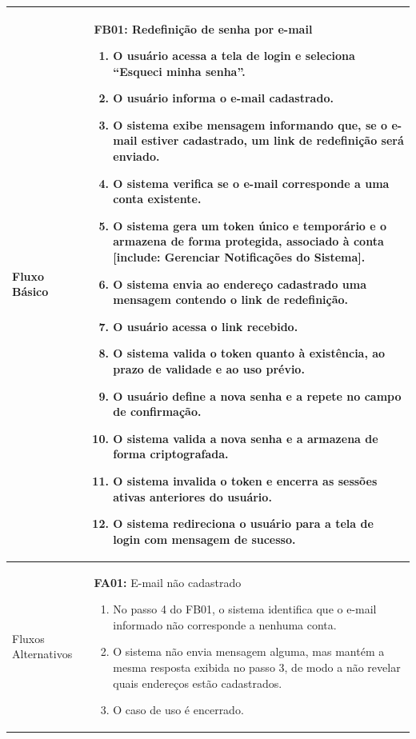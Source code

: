 \begin{longtable}{ >{\raggedright}p{2.8cm} | >{\raggedright\arraybackslash}p{10.7cm} }
Fluxo Básico & \mbox{}
\textbf{FB01:} Redefinição de senha por e-mail
\vspace{2pt}
\begin{enumerate}[nosep,leftmargin=1.2em,topsep=0pt,partopsep=0pt,parsep=0pt,itemsep=0pt,after=\vspace{2pt}]
    \item O usuário acessa a tela de login e seleciona ``Esqueci minha senha''.
    \item O usuário informa o e-mail cadastrado.
    \item O sistema exibe mensagem informando que, se o e-mail estiver cadastrado, um link de redefinição será enviado.
    \item O sistema verifica se o e-mail corresponde a uma conta existente.
    \item O sistema gera um token único e temporário e o armazena de forma protegida, associado à conta [include: Gerenciar Notificações do Sistema].
    \item O sistema envia ao endereço cadastrado uma mensagem contendo o link de redefinição.
    \item O usuário acessa o link recebido.
    \item O sistema valida o token quanto à existência, ao prazo de validade e ao uso prévio.
    \item O usuário define a nova senha e a repete no campo de confirmação.
    \item O sistema valida a nova senha e a armazena de forma criptografada.
    \item O sistema invalida o token e encerra as sessões ativas anteriores do usuário.
    \item O sistema redireciona o usuário para a tela de login com mensagem de sucesso.
\end{enumerate}
\mbox{} \\ \hline

Fluxos Alternativos & \mbox{}
\textbf{FA01:} E-mail não cadastrado
\vspace{2pt}
\begin{enumerate}[nosep,leftmargin=1.2em,topsep=0pt,partopsep=0pt,parsep=0pt,itemsep=0pt,after=\vspace{2pt}]
    \item No passo 4 do FB01, o sistema identifica que o e-mail informado não corresponde a nenhuma conta.
    \item O sistema não envia mensagem alguma, mas mantém a mesma resposta exibida no passo 3, de modo a não revelar quais endereços estão cadastrados.
    \item O caso de uso é encerrado.
\end{enumerate}


\end{longtable}

